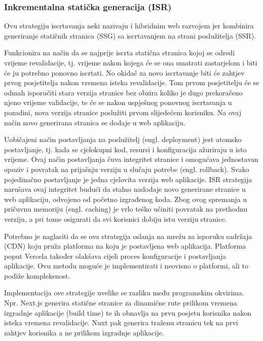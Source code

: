 \subsubsection{Inkrementalna statička generacija (ISR)}

Ovu strategiju iscrtavanja neki nazivaju i hibridnim web razvojem jer kombinira generiranje statičnih stranica (SSG) sa iscrtavanjem na strani poslužitelja (SSR).

\bigskip

Funkcionira na način da se najprije iscrta statična stranica kojoj se odredi vrijeme revalidacije, tj. vrijeme nakon kojega će se ona smatrati zastarjelom i biti će ju potrebno ponovno  iscrtati. No okidač za novo iscrtavanje biti će zahtjev prvog posjetitelja nakon vremena isteka revalidacije. Tom prvom posjetitelju će se odmah isporučiti stara verzija stranice bez obzira koliko je dugo prekoračeno njeno vrijeme validacije, te će se nakon uspješnog ponovnog iscrtavanja u pozadini, nova verzija stranice poslužiti prvom slijedećem korisniku. Na ovaj način novo generirana stranica se dodaje u web aplikaciju.

\bigskip

Uobičajeni način postavljanja na poslužitelj (engl. deployment) jest atomsko postavljanje, tj. kada se cjelokupni kod, resursi i konfiguracija ažuriraju u isto vrijeme. Ovaj način postavljanja čuva integritet stranice i omogućava jednostavan opoziv i povratak na prijašnju verziju u slučaju potrebe (engl. rollback). Svako pojedinačno postavljanje je jedna cjelovita verzija web aplikacije. ISR strategija narušava ovaj integritet budući da stalno nadodaje novo generirane stranice u web aplikaciju, odvojeno od početno izgrađenog koda. Zbog ovog spremanja u pričuvnu memoriju (engl. caching)  je vrlo teško učiniti povratak na prethodnu verziju, a pri tome osigurati da svi korisnici dobiju istu verziju stranice. \cite{flaws2021isr}

\bigskip

Potrebno je naglasiti da se ova strategija oslanja na mrežu za isporuku sadržaja (CDN) koju pruža platforma na koju je postavljena web aplikacija. Platforma poput Vercela također olakšava cijeli proces konfiguracije i postavljanja aplikacije. Ovu metodu moguće je implementirati i neovisno o platformi, ali to podiže kompleksnost.

\bigskip

Implementacija ove strategije uvelike se razliku među programskim okvirima.
Npr. Next.js generira statične stranice za dinamične rute prilikom vremena izgradnje aplikacije (build time) te ih obnavlja na prvu posjetu korisnika nakon isteka vremena revalidacije. Nuxt pak generira traženu stranicu tek na prvi zahtjev korisnika a ne prilikom izgradnje aplikacije. \cite{troyan2024nuxt}

